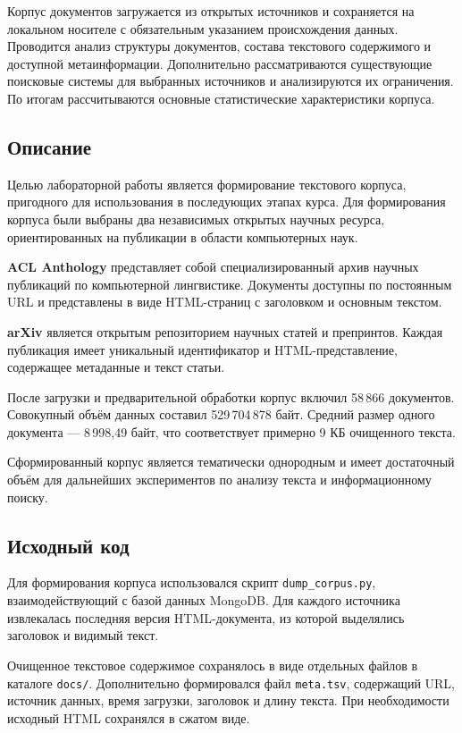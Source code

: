 \documentclass[12pt,a4paper]{article}
\begin{document}
Корпус документов загружается из открытых источников и сохраняется на локальном носителе с обязательным указанием происхождения данных. Проводится анализ структуры документов, состава текстового содержимого и доступной метаинформации. Дополнительно рассматриваются существующие поисковые системы для выбранных источников и анализируются их ограничения. По итогам рассчитываются основные статистические характеристики корпуса.

\subsection*{Описание}

Целью лабораторной работы является формирование текстового корпуса, пригодного для использования в последующих этапах курса. Для формирования корпуса были выбраны два независимых открытых научных ресурса, ориентированных на публикации в области компьютерных наук.

\textbf{ACL Anthology} представляет собой специализированный архив научных публикаций по компьютерной лингвистике. Документы доступны по постоянным URL и представлены в виде HTML-страниц с заголовком и основным текстом.

\textbf{arXiv} является открытым репозиторием научных статей и препринтов. Каждая публикация имеет уникальный идентификатор и HTML-представление, содержащее метаданные и текст статьи.

После загрузки и предварительной обработки корпус включил 58\,866 документов. Совокупный объём данных составил 529\,704\,878 байт. Средний размер одного документа — 8\,998,49 байт, что соответствует примерно 9 КБ очищенного текста.

Сформированный корпус является тематически однородным и имеет достаточный объём для дальнейших экспериментов по анализу текста и информационному поиску.

\subsection*{Исходный код}

Для формирования корпуса использовался скрипт \texttt{dump\_corpus.py}, взаимодействующий с базой данных MongoDB. Для каждого источника извлекалась последняя версия HTML-документа, из которой выделялись заголовок и видимый текст.

Очищенное текстовое содержимое сохранялось в виде отдельных файлов в каталоге \texttt{docs/}. Дополнительно формировался файл \texttt{meta.tsv}, содержащий URL, источник данных, время загрузки, заголовок и длину текста. При необходимости исходный HTML сохранялся в сжатом виде.
\end{document}
